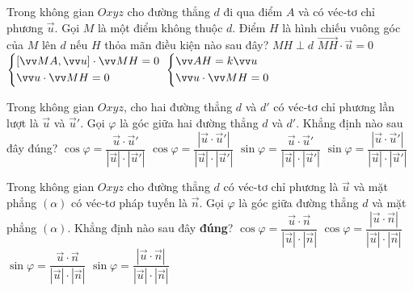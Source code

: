 \begin{ex}%
	Trong không gian $Oxyz$ cho đường thẳng $d$ đi qua điểm $A$ và có véc-tơ chỉ phương $\vec{u}$. Gọi $M$ là một điểm không thuộc $d$. Điểm $H$ là hình chiếu vuông góc của $M$ lên $d$ nếu $H$ thỏa mãn điều kiện nào sau đây?
	\choice
	{$MH \perp d$}
	{$\vec{MH}\cdot \vec{u} = 0$}
	{$\heva{&[\vec{MA},\vec{u}]\cdot \vec{MH} = 0\\&\vec{u}\cdot \vec{MH} = 0}$}
	{\True $\heva{&\vec{AH} = k\vec{u}\\&\vec{u}\cdot \vec{MH} = 0}$}
\end{ex}

\begin{ex}%
	Trong không gian $Oxyz$, cho hai đường thẳng $d$ và $d'$ có véc-tơ chỉ phương lần lượt là $\vec{u}$ và $\vec{u}'$. Gọi $\varphi$ là góc giữa hai đường thẳng $d$ và $d'$. Khẳng định nào sau đây đúng?
	\choice
	{$\cos \varphi = \dfrac{\vec{u}\cdot \vec{u}'}{|\vec{u}|\cdot |\vec{u}'|}$}
	{\True $\cos \varphi = \dfrac{|\vec{u}\cdot \vec{u}'|}{|\vec{u}|\cdot |\vec{u}'|}$}
	{$\sin \varphi = \dfrac{\vec{u}\cdot \vec{u}'}{|\vec{u}|\cdot |\vec{u}'|}$}
	{$\sin \varphi = \dfrac{|\vec{u}\cdot \vec{u}'|}{|\vec{u}|\cdot |\vec{u}'|}$}
\end{ex}

\begin{ex}%
	Trong không gian $Oxyz$ cho đường thẳng $d$ có véc-tơ chỉ phương là $\vec{u}$ và mặt phẳng $(\alpha)$ có véc-tơ pháp tuyến là $\vec{n}$. Gọi $\varphi$ là góc giữa đường thẳng $d$ và mặt phẳng $(\alpha)$. Khẳng định nào sau đây \textbf{đúng}?
	\choice
	{$\cos \varphi = \dfrac{\vec{u}\cdot \vec{n}}{|\vec{u}|\cdot |\vec{n}|}$}
	{$\cos \varphi = \dfrac{|\vec{u}\cdot \vec{n}|}{|\vec{u}|\cdot |\vec{n}|}$}
	{$\sin \varphi = \dfrac{\vec{u}\cdot \vec{n}}{|\vec{u}|\cdot |\vec{n}|}$}
	{\True $\sin \varphi = \dfrac{|\vec{u}\cdot \vec{n}|}{|\vec{u}|\cdot |\vec{n}|}$}
\end{ex}

